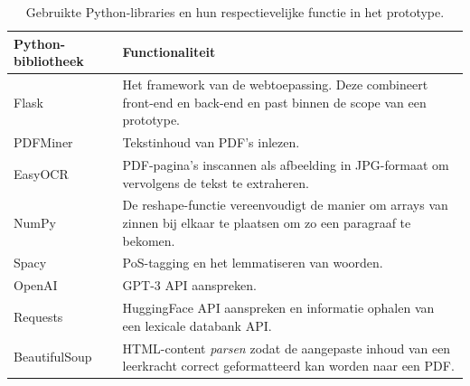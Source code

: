 \begin{center}
	\begin{table}[H]
	\begin{tabular}{ | m{4cm} | m{12cm} | } 
		\hline
		\textbf{Python-bibliotheek} & \textbf{Functionaliteit} \\
		\hline
		Flask					& Het framework van de webtoepassing. Deze combineert front-end en back-end en past binnen de scope van een prototype. \\ %
		\hline
		PDFMiner 				& Tekstinhoud van PDF's inlezen. \\ 
		\hline
		EasyOCR					& PDF-pagina's inscannen als afbeelding in JPG-formaat om vervolgens de tekst te extraheren. \\
		\hline
		NumPy 					& De reshape-functie vereenvoudigt de manier om arrays van zinnen bij elkaar te plaatsen om zo een paragraaf te bekomen. \\
		\hline		
		Spacy 					& PoS-tagging en het lemmatiseren van woorden. \\
		\hline
		OpenAI					& GPT-3 API aanspreken. \\
		\hline
		Requests				& HuggingFace API aanspreken en informatie ophalen van een lexicale databank API. \\
		\hline
		BeautifulSoup			& HTML-content \textit{parsen} zodat de aangepaste inhoud van een leerkracht correct geformatteerd kan worden naar een PDF. \\
		\hline
	\end{tabular}
	\label{table:python-libraries}
	\caption{Gebruikte Python-libraries en hun respectievelijke functie in het prototype.}
	\end{table}
\end{center}

\medspace

